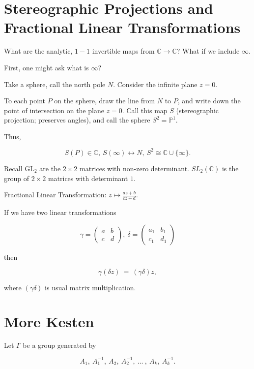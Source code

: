 \documentclass[12pt,letterpaper]{report}
\newcommand\be{\begin{equation}}
\newcommand\ee{\end{equation}}
\newcommand{\Pone}{\ensuremath{\mathbb{P}^1}}
\newcommand{\C}{\ensuremath{\mathbb{C}}}
\begin{document}
\section{Stereographic Projections and Fractional Linear Transformations}

What are the analytic, $1-1$ invertible maps from $\C \to \C$?
What if we include $\infty$.

First, one might ask what is $\infty$?

Take a sphere, call the north pole $N$. Consider the infinite
plane $z = 0$.

To each point $P$ on the sphere, draw the line from $N$ to $P$,
and write down the point of intersection on the plane $z = 0$.
Call this map $S$ (stereographic projection; preserves angles),
and call the sphere $S^2 = \Pone$.

Thus,

\be S(P) \in \C, \ S(\infty) \leftrightarrow N, \ S^2 \cong \C
\cup \{\infty\}. \ee

Recall $\text{GL}_2$ are the $2\times 2$ matrices with non-zero
determinant. $SL_2(\C)$ is the group of $2 \times 2$ matrices with
determinant $1$.

Fractional Linear Transformation: $z \mapsto \frac{az+b}{cz+d}$.

If we have two linear transformations

\be \gamma = \left(\begin{array}{cc}
                        a &  b  \\
                        c  & d
                          \end{array}\right), \
\delta = \left(\begin{array}{cc}
                        a_1 &  b_1  \\
                        c_1   & d_1
                          \end{array}\right)
\ee

then

\be \gamma (\delta z) \ = \ (\gamma \delta)z, \ee

where $(\gamma \delta)$ is usual matrix multiplication.


\section{More Kesten}

Let $\Gamma$ be a group generated by

\be A_1,\ A_1^{-1}, \ A_2,\ A_2^{-1}, \ \dots \ ,\ A_k,\ A_k^{-1}.
\ee
\end{document}
